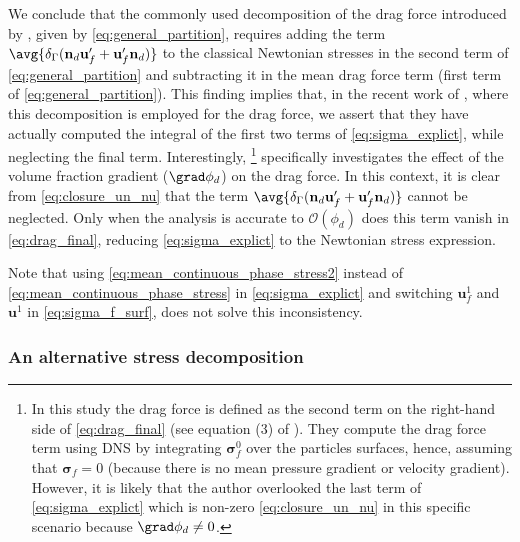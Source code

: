 We conclude that the commonly used decomposition of the drag force introduced by \citet{zhang1997momentum,jackson2000}, given by \ref{eq:general_partition}, requires adding the term  $\avg{\delta_\Gamma (\textbf{n}_d \textbf{u}_f'+  \textbf{u}_f' \textbf{n}_d)}$ to the classical Newtonian stresses in the second term of \ref{eq:general_partition} and subtracting it in the mean drag force term (first term of \ref{eq:general_partition}). 
This finding implies that, in the recent work of \citet{wang2021numerical, wang2024effect}, where this decomposition is employed for the drag force, we assert that they have actually computed the integral of the first two terms of \ref{eq:sigma_explict}, while neglecting the final term. 
Interestingly, \citet{wang2024effect}\footnote{
    In this study the drag force is defined as the second term on the right-hand side of \ref{eq:drag_final} (see equation (3) of \citet{wang2024effect}).
    They compute the drag force term using DNS by integrating $\bm\sigma_f^0$ over the particles surfaces, hence, assuming that $\bm\sigma_f=0$ (because there is no mean pressure gradient or velocity gradient).  
    However, it is likely that the author overlooked the last term of \ref{eq:sigma_explict} which is non-zero \eqref{eq:closure_un_nu} in this specific scenario because $\grad \phi_d \neq 0$. 
} specifically investigates the effect of the volume fraction gradient ($\grad \phi_d$) on the drag force. 
In this context, it is clear from \eqref{eq:closure_un_nu} that the term $\avg{\delta_\Gamma (\textbf{n}_d \textbf{u}_f'+  \textbf{u}_f' \textbf{n}_d)}$ cannot be neglected. 
Only when the analysis is accurate to $\mathcal{O}(\phi_d)$ does this term vanish in \ref{eq:drag_final}, reducing \ref{eq:sigma_explict} to the Newtonian stress expression. 

Note that using \ref{eq:mean_continuous_phase_stress2} instead of \ref{eq:mean_continuous_phase_stress} in \ref{eq:sigma_explict} and switching $\textbf{u}_f^1$ and $\textbf{u}^1$ in \ref{eq:sigma_f_surf}, does not solve this inconsistency. 

\subsubsection{An alternative stress decomposition}

